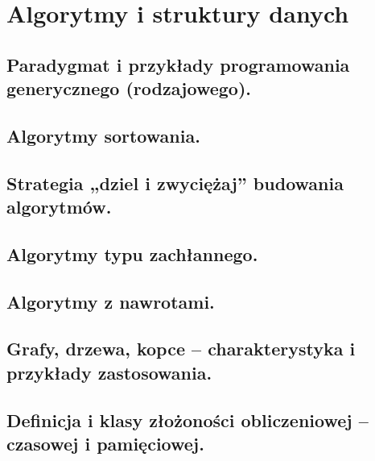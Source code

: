 \chapter{Algorytmy i struktury danych}
\section{Paradygmat i przykłady programowania generycznego (rodzajowego). }
\section{Algorytmy sortowania. }
\section{Strategia „dziel i zwyciężaj” budowania algorytmów.}
\section{Algorytmy typu zachłannego.}
\section{Algorytmy z nawrotami.}
\section{Grafy, drzewa, kopce – charakterystyka i przykłady zastosowania.}
\section{Definicja i klasy złożoności obliczeniowej – czasowej i pamięciowej.}

